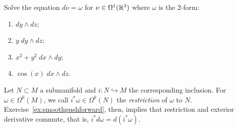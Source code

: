 \begin{exercise}
  Solve the equation $d \nu = \omega$ for $\nu \in \Omega^1(\mathbb{R}^3)$ where $\omega$ is the $2$-form:
  \begin{enumerate}
    \item $d y \wedge d z$;
    \item $y\; d y \wedge d z$;
    \item $x^2 + y^2 \; d x \wedge d y$;
    \item $\cos(x)\; d x \wedge d z$.
  \end{enumerate}
\end{exercise}

Let $N\subset M$ a submanifold and $i:N\hookrightarrow M$ the corresponding inclusion.
For $\omega\in\Omega^k(M)$, we call $i^*\omega \in \Omega^k(N)$ the \emph{restriction} of $\omega$ to $N$.
Exercise~\ref{ex:smoothpushforward}, then, implies that restriction and exterior derivative commute, that is, $i^*d\omega = d(i^*\omega)$.

